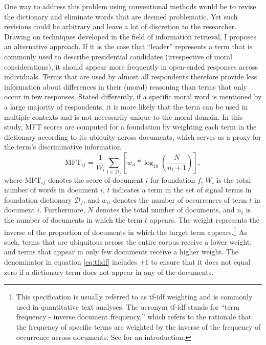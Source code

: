 \documentclass[12pt]{article}
\begin{document}
One way to address this problem using conventional methods would be to revise the dictionary and eliminate words that are deemed problematic. Yet such revisions could be arbitrary and leave a lot of discretion to the researcher. Drawing on techniques developed in the field of information retrieval, I proposes an alternative approach. If it is the case that ``leader'' represents a term that is commonly used to describe presidential candidates (irrespective of moral considerations), it should appear more frequently in open-ended responses across individuals. Terms that are used by almost all respondents therefore provide less information about differences in their (moral) reasoning than terms that only occur in few responses.  Stated differently, if a specific moral word is mentioned by a large majority of respondents, it is more likely that the term can be used in multiple contexts and is not necessarily unique to the moral domain. In this study, MFT scores are computed for a foundation by weighting each term in the dictionary according to its ubiquity across documents, which serves as a proxy for the term's discriminative information:
\begin{equation}\label{eq:tfidf}
\text{MFT}_{if} = \dfrac{1}{W_i} \sum_{t \in \mathcal{D}_f} \left[ w_{it} * \log_{10}\left( \dfrac{N}{n_t+1}\right) \right],
\end{equation}
where $\text{MFT}_{if}$ denotes the score of document $i$ for foundation $f$, $W_i$ is the total number of words in document $i$, $t$ indicates a term in the set of signal terms in foundation dictionary $\mathcal{D}_f$, and $w_{it}$ denotes the number of occurrences of term $t$ in document $i$. Furthermore, $N$ denotes the total number of documents, and $n_t$ is the number of documents in which the term $t$ appears. The weight represents the inverse of the proportion of documents in which the target term appears.\footnote{This specification is usually referred to as tf-idf weighting and is commonly used in quantitative text analyses. The acronym tf-idf stands for ``term frequency - inverse document frequency,'' which refers to the rationale that the frequency of specific terms are weighted by the inverse of the frequency of occurrence across documents. See \citet[ch. 6]{manning2008introduction} for an introduction.} As such, terms that are ubiquitous across the entire corpus receive a lower weight, and terms that appear in only few documents receive a higher weight. The denominator in equation \eqref{eq:tfidf} includes $+1$ to ensure that it does not equal zero if a dictionary term does not appear in any of the documents.
\end{document}
